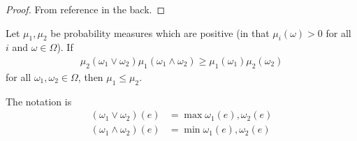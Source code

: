 \begin{proof}
  From reference in the back.
\end{proof}

\begin{thm}
  \label{defn:random_walks_on_graphs:8}
  Let $\mu_{1}, \mu_{2}$ be probability measures which are positive
  (in that $\mu_{i}(\omega) > 0$ for all $i$ and $\omega \in \Omega$).
  If
  \begin{align}
    \label{eq:3}
    \mu_{2}(\omega_{1} \vee \omega_{2}) \mu_{1}(\omega_{1} \wedge
    \omega_{2}) \geq \mu_{1}(\omega_{1})\mu_{2}(\omega_{2})
  \end{align} for all $\omega_{1}, \omega_{2} \in \Omega$, then
  $\mu_{1} \leq \mu_{2}$.

  The notation is
  \begin{align}
    \label{eq:4}
    (\omega_{1} \vee \omega_{2})(e) &= \max{\omega_{1}(e),
      \omega_{2}(e)} \\
    (\omega_{1} \wedge \omega_{2})(e) &= \min{\omega_{1}(e), \omega_{2}(e)}
  \end{align} 
\end{thm}

